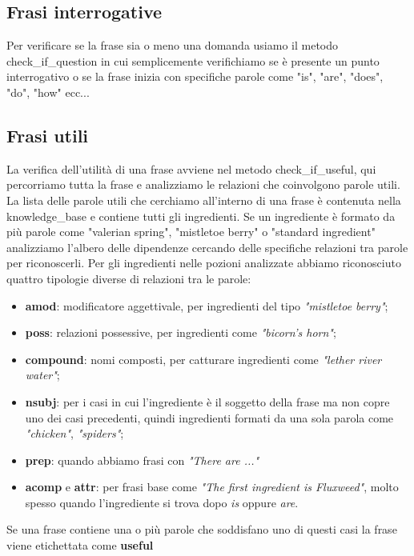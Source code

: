 \subsection{Frasi interrogative}
Per verificare se la frase sia o meno una domanda usiamo il metodo check\_if\_question in cui semplicemente verifichiamo se è presente un punto interrogativo o se la frase inizia con specifiche parole come "is", "are", "does", "do", "how" ecc...
\subsection{Frasi utili}
La verifica dell'utilità di una frase avviene nel metodo check\_if\_useful, qui percorriamo tutta la frase e analizziamo le relazioni che coinvolgono parole utili. La lista delle parole utili che cerchiamo all'interno di una frase è contenuta nella knowledge\_base e contiene tutti gli ingredienti. Se un ingrediente è formato da più parole come "valerian spring", "mistletoe berry" o  "standard ingredient" analizziamo l'albero delle dipendenze cercando delle specifiche relazioni tra parole per riconoscerli. Per gli ingredienti nelle pozioni analizzate abbiamo riconosciuto quattro tipologie diverse di relazioni tra le parole:
\begin{itemize}
    \item \textbf{amod}: modificatore aggettivale, per ingredienti del tipo \textit{"mistletoe berry"};
    \item \textbf{poss}: relazioni possessive, per ingredienti come \textit{"bicorn's horn"};
    \item \textbf{compound}: nomi composti, per catturare ingredienti come \textit{"lether river water"};
    \item \textbf{nsubj}: per i casi in cui l'ingrediente è il soggetto della frase ma non copre uno dei casi precedenti, quindi ingredienti formati da una sola parola come \textit{"chicken"}, \textit{"spiders"};
    \item \textbf{prep}: quando abbiamo frasi con \textit{"There are ..."}
    \item \textbf{acomp} e \textbf{attr}: per frasi base come \textit{"The first ingredient is Fluxweed"}, molto spesso quando l'ingrediente si trova dopo \textit{is} oppure \textit{are}.
\end{itemize}
Se una frase contiene una o più parole che soddisfano uno di questi casi la frase viene etichettata come \textbf{useful}

